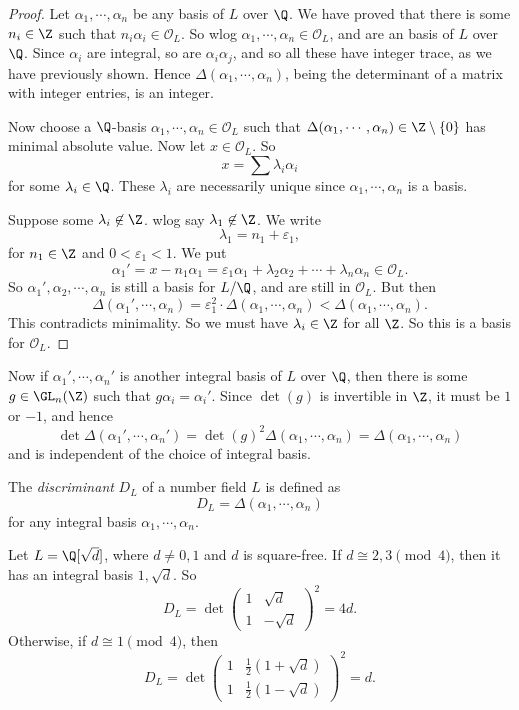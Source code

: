 \documentclass[a4paper]{article}
\begin{document}
\begin{proof}
  Let $\alpha_1, \cdots, \alpha_n$ be any basis of $L$ over $\Q$. We have proved that there is some $n_i \in \Z$ such that $n_i \alpha_i \in \mathcal{O}_L$. So wlog $\alpha_1, \cdots, \alpha_n \in \mathcal{O}_L$, and are an basis of $L$ over $\Q$. Since $\alpha_i$ are integral, so are $\alpha_i \alpha_j$, and so all these have integer trace, as we have previously shown. Hence $\Delta(\alpha_1, \cdots, \alpha_n)$, being the determinant of a matrix with integer entries, is an integer.

  Now choose a $\Q$-basis $\alpha_1, \cdots, \alpha_n \in \mathcal{O}_L$ such that $\Delta(\alpha_1, \cdots, \alpha_n) \in \Z\setminus \{0\}$ has minimal absolute value. Now let $x \in \mathcal{O}_L$. So
  \[
    x = \sum \lambda_i \alpha_i
  \]
  for some $\lambda_i \in \Q$. These $\lambda_i$ are necessarily unique since $\alpha_1, \cdots, \alpha_n$ is a basis.

  Suppose some $\lambda_i \not\in \Z$. wlog say $\lambda_1 \not \in \Z$. We write
  \[
    \lambda_1 = n_1 + \varepsilon_1,
  \]
  for $n_1 \in \Z$ and $0 < \varepsilon_1 < 1$. We put
  \[
    \alpha_1' = x - n_1 \alpha_1 = \varepsilon_1 \alpha_1 + \lambda_2 \alpha_2 + \cdots + \lambda_n \alpha_n \in \mathcal{O}_L.
  \]
  So $\alpha_1', \alpha_2, \cdots, \alpha_n$ is still a basis for $L/\Q$, and are still in $\mathcal{O}_L$. But then
  \[
    \Delta(\alpha_1', \cdots, \alpha_n) = \varepsilon_1^2 \cdot \Delta(\alpha_1, \cdots, \alpha_n) < \Delta(\alpha_1, \cdots, \alpha_n).
  \]
  This contradicts minimality. So we must have $\lambda_i \in \Z$ for all $\Z$. So this is a basis for $\mathcal{O}_L$.
\end{proof}

Now if $\alpha_1', \cdots, \alpha_n'$ is another integral basis of $L$ over $\Q$, then there is some $g \in \GL_n(\Z)$ such that $g\alpha_i = \alpha_i'$. Since $\det (g)$ is invertible in $\Z$, it must be $1$ or $-1$, and hence
\[
  \det \Delta(\alpha_1', \cdots, \alpha_n') = \det(g)^2 \Delta (\alpha_1, \cdots, \alpha_n) = \Delta(\alpha_1, \cdots, \alpha_n)
\]
and is independent of the choice of integral basis.
\begin{defi}[Discriminant]
  The \emph{discriminant} $D_L$ of a number field $L$ is defined as
  \[
    D_L = \Delta(\alpha_1, \cdots, \alpha_n)
  \]
  for any integral basis $\alpha_1, \cdots, \alpha_n$.
\end{defi}

\begin{eg}
  Let $L = \Q[\sqrt{d}]$, where $d \not= 0, 1$ and $d$ is square-free. If $d \cong 2, 3 \pmod 4$, then it has an integral basis $1, \sqrt{d}$. So
  \[
    D_L = \det
    \begin{pmatrix}
      1 & \sqrt{d}\\
      1 & -\sqrt{d}
    \end{pmatrix}^2 = 4d.
  \]
  Otherwise, if $d \cong 1 \pmod 4$, then
  \[
    D_L = \det
    \begin{pmatrix}
      1 & \frac{1}{2}(1 + \sqrt{d})\\
      1 & \frac{1}{2}(1 - \sqrt{d})
    \end{pmatrix}^2 = d.
  \]
\end{eg}
\end{document}
